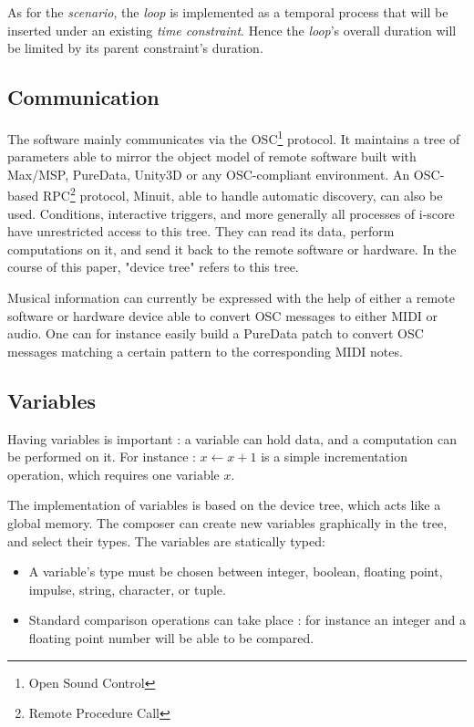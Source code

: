 \documentclass{article}
\newcommand{\scenario}{\textit{scenario}\xspace}
\newcommand{\Loop}{\textit{loop}\xspace}
\newcommand{\timeconstraint}{\textit{time constraint}\xspace}
\begin{document}
As for the \scenario, the \Loop is implemented as a temporal process that will be inserted under an existing \timeconstraint. 
Hence the \Loop's overall duration will be limited by its parent constraint's duration.

\subsection{Communication}
The software mainly communicates via the OSC\footnote{Open Sound Control} protocol.
It maintains a tree of parameters able to mirror 
the object model of remote software built with Max/MSP, PureData, Unity3D or any OSC-compliant environment. 
An OSC-based RPC\footnote{Remote Procedure Call} protocol, Minuit, able to handle automatic discovery, can also be used. 
Conditions, interactive triggers, and more generally all processes of i-score have unrestricted 
access to this tree.
They can read its data, perform computations on it, and send it back to the remote software or hardware.
In the course of this paper, "device tree" refers to this tree.

Musical information can currently be expressed with the help of either a remote software or hardware device able 
to convert OSC messages to either MIDI or audio.
One can for instance easily build a PureData patch to convert OSC messages matching a certain pattern 
to the corresponding MIDI notes.

\subsection{Variables}
Having variables is important : a variable can hold data, 
and a computation can be performed on it.
For instance : $x \leftarrow x + 1$ is a simple incrementation 
operation, which requires one variable $x$.

The implementation of variables is based on the device tree, which 
acts like a global memory. 
The composer can create new variables graphically in the tree, and select their types.
The variables are statically typed: 
\begin{itemize}
    \item A variable's type must be chosen between integer, boolean, floating point, impulse, string, character, or tuple.
    \item Standard comparison operations can take place : for instance an integer and a floating point number will be able to be compared.
\end{itemize} 
\end{document}
